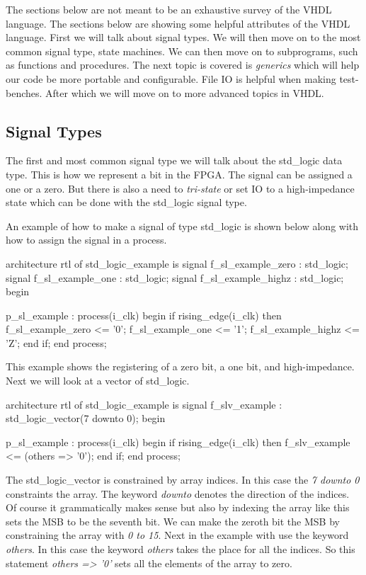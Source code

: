 The sections below are not meant to be an exhaustive survey of the \ac{VHDL} language. The sections below are showing some helpful attributes of the \ac{VHDL} language. First we will talk about signal types. We will then move on to the most common signal type, state machines. We can then move on to subprograms, such as functions and procedures. The next topic is covered is \emph{generics} which will help our code be more portable and configurable. File \ac{IO} is helpful when making test-benches. After which we will move on to more advanced topics in \ac{VHDL}.

\subsection{Signal Types}

The first and most common signal type we will talk about the std\_logic data type. This is how we represent a bit in the \ac{FPGA}. The signal can be assigned a one or a zero. But there is also a need to \emph{tri-state} or set \ac{IO} to a high-impedance state which can be done with the std\_logic signal type. 

An example of how to make a signal of type std\_logic is shown below along with how to assign the signal in a process.

\begin{VHDLlisting}[tabsize=4]
architecture rtl of std_logic_example is
    signal f_sl_example_zero     : std_logic;
    signal f_sl_example_one      : std_logic;
    signal f_sl_example_highz    : std_logic;
begin

p_sl_example : process(i_clk)
begin
    if rising_edge(i_clk) then
        f_sl_example_zero  <= '0';
        f_sl_example_one   <= '1';
        f_sl_example_highz <= 'Z';
    end if;
end process;
\end{VHDLlisting}

This example shows the registering of a zero bit, a one bit, and high-impedance. Next we will look at a vector of std\_logic.

\begin{VHDLlisting}[tabsize=4]
architecture rtl of std_logic_example is
    signal f_slv_example  : std_logic_vector(7 downto 0);
begin

p_sl_example : process(i_clk)
begin
    if rising_edge(i_clk) then
        f_slv_example <= (others => '0');
    end if;
end process;
\end{VHDLlisting}

The std\_logic\_vector is constrained by array indices. In this case the \emph{7 downto 0} constraints the array. The keyword \emph{downto} denotes the direction of the indices. Of course it grammatically makes sense but also by indexing the array like this sets the \ac{MSB} to be the seventh bit. We can make the zeroth bit the \ac{MSB} by constraining the array with \emph{0 to 15}. Next in the example with use the keyword \emph{others}. In this case the keyword \emph{others} takes the place for all the indices. So this statement \emph{others => '0'} sets all the elements of the array to zero. 
	

